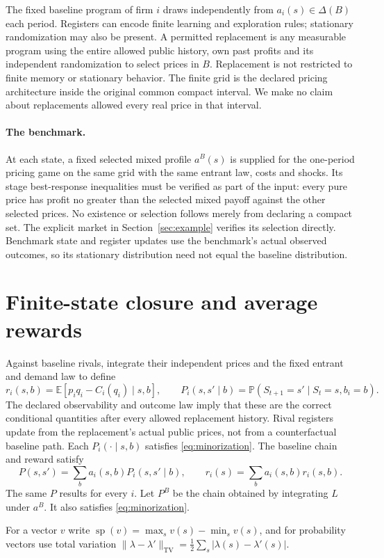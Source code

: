 \documentclass[11pt,a4paper]{article}
\newcommand{\E}{\mathbb E}
\newcommand{\Prob}{\mathbb P}
\newcommand{\spn}{\operatorname{sp}}
\newcommand{\TV}{\operatorname{TV}}
\begin{document}
The fixed baseline program of firm $i$ draws independently from
$a_i(s)\in\Delta(B)$ each period. Registers can encode finite learning and
exploration rules; stationary randomization may also be present. A permitted
replacement is any measurable program using the entire allowed public history,
own past profits and its independent randomization to select prices in $B$.
Replacement is not restricted to finite memory or stationary behavior.
The finite grid is the declared pricing architecture inside the original common
compact interval. We make no claim about replacements allowed every real price
in that interval.

\paragraph{The benchmark.}
At each state, a fixed selected mixed profile $a^B(s)$ is supplied for the
one-period pricing game on the same grid with the same entrant law, costs and
shocks. Its stage best-response inequalities must be verified as part of the
input: every pure price has profit no greater than the selected mixed payoff
against the other selected prices. No existence or selection follows merely
from declaring a compact set. The explicit market in Section~\ref{sec:example}
verifies its selection directly. Benchmark state and register updates use
the benchmark's actual observed outcomes, so its stationary distribution need
not equal the baseline distribution.

\section{Finite-state closure and average rewards}
Against baseline rivals, integrate their independent prices and the fixed
entrant and demand law to define
\[
 r_i(s,b)=\E[p_iq_i-C_i(q_i)\mid s,b],\qquad
 P_i(s,s'\mid b)=\Prob(S_{t+1}=s'\mid S_t=s,b_i=b).
\]
The declared observability and outcome law imply that these are the correct
conditional quantities after every allowed replacement history. Rival registers
update from the replacement's actual public prices, not from a counterfactual
baseline path. Each $P_i(\cdot\mid s,b)$ satisfies \eqref{eq:minorization}.
The baseline chain and reward satisfy
\[
 P(s,s')=\sum_ba_i(s,b)P_i(s,s'\mid b),\qquad
 r_i(s)=\sum_ba_i(s,b)r_i(s,b).
\]
The same $P$ results for every $i$. Let $P^B$ be the chain obtained by integrating
$L$ under $a^B$. It also satisfies \eqref{eq:minorization}.

For a vector $v$ write $\spn(v)=\max_sv(s)-\min_sv(s)$, and for probability
vectors use total variation $\|\lambda-\lambda'\|_{\TV}
=\frac12\sum_s|\lambda(s)-\lambda'(s)|$.
\end{document}
